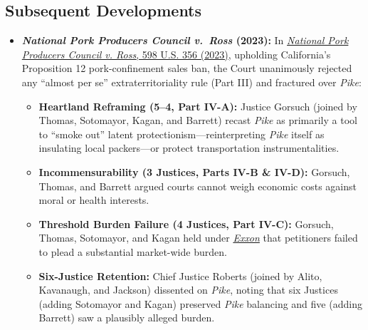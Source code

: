 \documentclass[12pt]{article}
\begin{document}
\subsection{Subsequent Developments}

\begin{itemize}

\item \textbf{\textit{National Pork Producers Council v.\ Ross} (2023):} In \href{https://www.law.cornell.edu/supremecourt/text/21-468}{\textit{National Pork Producers Council v. Ross}, 598 U.S. 356 (2023)}, upholding California's Proposition 12 pork-confinement sales ban, the Court unanimously rejected any ``almost per se'' extraterritoriality rule (Part III) and fractured over \textit{Pike}:
\begin{itemize}
  \item \textbf{Heartland Reframing (5--4, Part IV-A):} Justice Gorsuch (joined by Thomas, Sotomayor, Kagan, and Barrett) recast \textit{Pike} as primarily a tool to ``smoke out'' latent protectionism---reinterpreting \textit{Pike} itself as insulating local packers---or protect transportation instrumentalities.
  \item \textbf{Incommensurability (3 Justices, Parts IV-B \& IV-D):} Gorsuch, Thomas, and Barrett argued courts cannot weigh economic costs against moral or health interests.
  \item \textbf{Threshold Burden Failure (4 Justices, Part IV-C):} Gorsuch, Thomas, Sotomayor, and Kagan held under \href{https://supreme.justia.com/cases/federal/us/437/117/}{\textit{Exxon}} that petitioners failed to plead a substantial market-wide burden.
  \item \textbf{Six-Justice Retention:} Chief Justice Roberts (joined by Alito, Kavanaugh, and Jackson) dissented on \textit{Pike}, noting that six Justices (adding Sotomayor and Kagan) preserved \textit{Pike} balancing and five (adding Barrett) saw a plausibly alleged burden.
\end{itemize}

\end{itemize}
\end{document}
